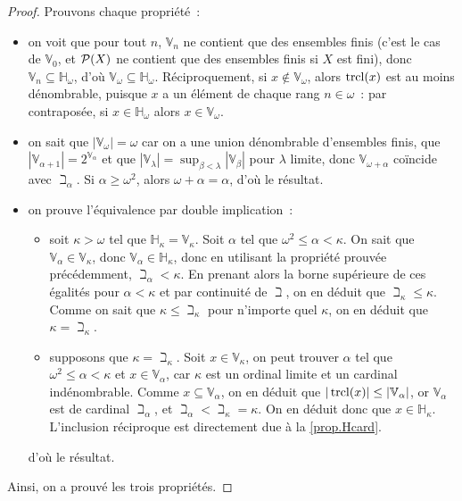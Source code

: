 \begin{proof}
  Prouvons chaque propriété~:
  \begin{itemize}
  \item on voit que pour tout $n$, $\mathbb V_n$ ne contient que des ensembles
    finis (c'est le cas de $\mathbb V_0$, et $\mathcal{P}(X)$ ne contient que des
    ensembles finis si $X$ est fini), donc
    $\mathbb V_n \subseteq \mathbb H_\omega$, d'où
    $\mathbb V_\omega \subseteq \mathbb H_\omega$. Réciproquement, si
    $x \notin \mathbb V_\omega$, alors $\operatorname{trcl}(x)$ est au moins dénombrable,
    puisque $x$ a un élément de chaque rang $n \in \omega$~: par contraposée,
    si $x\in \mathbb H_\omega$ alors $x\in \mathbb V_\omega$.
  \item on sait que $|\mathbb V_\omega| = \omega$ car on a une union
    dénombrable d'ensembles finis, que
    $|\mathbb V_{\alpha + 1}| = 2^{\mathbb V_\alpha}$ et que
    $|\mathbb V_\lambda | = \sup_{\beta < \lambda} |\mathbb V_\beta|$ pour
    $\lambda$ limite, donc $\mathbb V_{\omega + \alpha}$ coïncide avec
    $\beth_\alpha$. Si $\alpha \geq \omega^2$, alors $\omega + \alpha = \alpha$,
    d'où le résultat.
  \item on prouve l'équivalence par double implication~:
    \begin{itemize}
    \item soit $\kappa > \omega$ tel que $\mathbb H_\kappa = \mathbb V_\kappa$.
      Soit $\alpha$ tel que $\omega^2\leq \alpha < \kappa$. On sait que
      $\mathbb V_\alpha \in \mathbb V_\kappa$, donc
      $\mathbb V_\alpha \in \mathbb H_\kappa$, donc en utilisant la propriété
      prouvée précédemment, $\beth_\alpha < \kappa$. En prenant alors la borne
      supérieure de ces égalités pour $\alpha < \kappa$ et par continuité de
      $\beth$, on en déduit que $\beth_\kappa \leq \kappa$. Comme on sait que
      $\kappa \leq \beth_\kappa$ pour n'importe quel $\kappa$, on en déduit que
      $\kappa = \beth_\kappa$.
    \item supposons que $\kappa = \beth_\kappa$. Soit $x \in \mathbb V_\kappa$,
      on peut trouver $\alpha$ tel que $\omega^2\leq \alpha < \kappa$ et
      $x \in \mathbb V_\alpha$, car $\kappa$ est un ordinal limite et un
      cardinal indénombrable. Comme $x \subseteq \mathbb V_\alpha$, on en
      déduit que $|\operatorname{trcl}(x)| \leq |\mathbb V_\alpha|$, or $\mathbb V_\alpha$ est
      de cardinal $\beth_\alpha$, et $\beth_\alpha < \beth_\kappa = \kappa$. On
      en déduit donc que $x \in \mathbb H_\kappa$. L'inclusion réciproque est
      directement due à la \cref{prop.Hcard}.
    \end{itemize}
    d'où le résultat.
  \end{itemize}
  Ainsi, on a prouvé les trois propriétés.
\end{proof}

